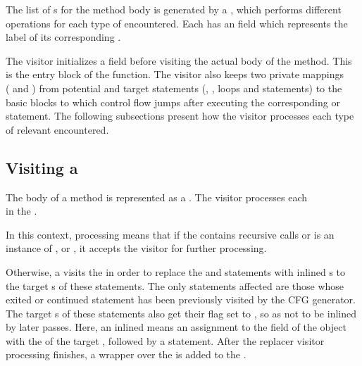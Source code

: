 The list of s for the method body is generated by a , which performs
different operations for each type of  encountered. Each  has an  field which
represents the label of its corresponding .

The visitor initializes a  field before visiting the actual body of the method. This is the entry
block of the function. The visitor also keeps two private mappings\\
( and )
from potential  and  target statements (, ,  loops and
 statements) to the basic blocks to which control flow jumps after executing the corresponding
 or  statement. The following subsections present how the visitor processes each type of
relevant  encountered.

\subsection{Visiting a }

The body of a method is represented as a . The visitor processes each\\
 in the .

In this context, processing means that if the  contains recursive calls or is an instance of
,  or ,
it accepts the visitor for further processing.

Otherwise, a  visits the  in order to replace the  and
 statements with inlined s to the target s of these
statements. The only statements affected are those whose exited or continued statement has been previously visited by
the CFG generator. The target s of these statements also get their  flag set to ,
so as not to be inlined by later passes. Here, an inlined  means an assignment to the
 field of the  object with the  of the target , followed by a 
statement. After the replacer visitor processing finishes, a  wrapper over the
 is added to the .

